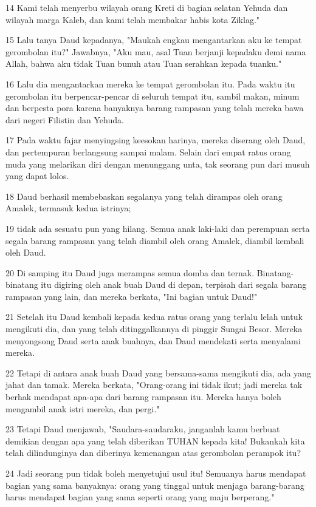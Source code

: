 \par 14 Kami telah menyerbu wilayah orang Kreti di bagian selatan Yehuda dan wilayah marga Kaleb, dan kami telah membakar habis kota Ziklag."
\par 15 Lalu tanya Daud kepadanya, "Maukah engkau mengantarkan aku ke tempat gerombolan itu?" Jawabnya, "Aku mau, asal Tuan berjanji kepadaku demi nama Allah, bahwa aku tidak Tuan bunuh atau Tuan serahkan kepada tuanku."
\par 16 Lalu dia mengantarkan mereka ke tempat gerombolan itu. Pada waktu itu gerombolan itu berpencar-pencar di seluruh tempat itu, sambil makan, minum dan berpesta pora karena banyaknya barang rampasan yang telah mereka bawa dari negeri Filistin dan Yehuda.
\par 17 Pada waktu fajar menyingsing keesokan harinya, mereka diserang oleh Daud, dan pertempuran berlangsung sampai malam. Selain dari empat ratus orang muda yang melarikan diri dengan menunggang unta, tak seorang pun dari musuh yang dapat lolos.
\par 18 Daud berhasil membebaskan segalanya yang telah dirampas oleh orang Amalek, termasuk kedua istrinya;
\par 19 tidak ada sesuatu pun yang hilang. Semua anak laki-laki dan perempuan serta segala barang rampasan yang telah diambil oleh orang Amalek, diambil kembali oleh Daud.
\par 20 Di samping itu Daud juga merampas semua domba dan ternak. Binatang-binatang itu digiring oleh anak buah Daud di depan, terpisah dari segala barang rampasan yang lain, dan mereka berkata, "Ini bagian untuk Daud!"
\par 21 Setelah itu Daud kembali kepada kedua ratus orang yang terlalu lelah untuk mengikuti dia, dan yang telah ditinggalkannya di pinggir Sungai Besor. Mereka menyongsong Daud serta anak buahnya, dan Daud mendekati serta menyalami mereka.
\par 22 Tetapi di antara anak buah Daud yang bersama-sama mengikuti dia, ada yang jahat dan tamak. Mereka berkata, "Orang-orang ini tidak ikut; jadi mereka tak berhak mendapat apa-apa dari barang rampasan itu. Mereka hanya boleh mengambil anak istri mereka, dan pergi."
\par 23 Tetapi Daud menjawab, "Saudara-saudaraku, janganlah kamu berbuat demikian dengan apa yang telah diberikan TUHAN kepada kita! Bukankah kita telah dilindunginya dan diberinya kemenangan atas gerombolan perampok itu?
\par 24 Jadi seorang pun tidak boleh menyetujui usul itu! Semuanya harus mendapat bagian yang sama banyaknya: orang yang tinggal untuk menjaga barang-barang harus mendapat bagian yang sama seperti orang yang maju berperang."
